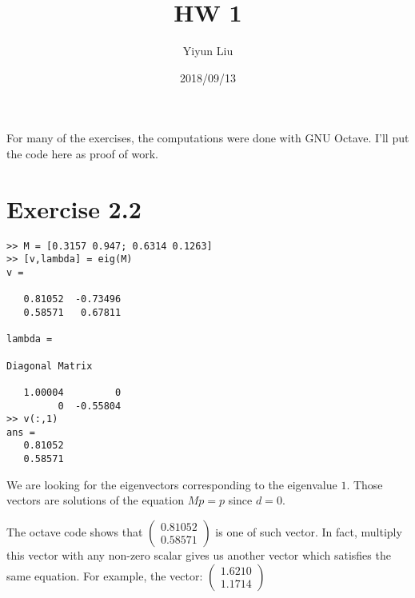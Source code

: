 \documentclass{article}
\title{HW 1}
\date{2018/09/13}
\author{Yiyun Liu}
\begin{document}
\maketitle
\lstset{basicstyle=\ttfamily}
For many of the exercises, the computations were done with GNU
Octave. I'll put the code here as proof of work.
\section*{Exercise 2.2}
\begin{lstlisting}
>> M = [0.3157 0.947; 0.6314 0.1263]
>> [v,lambda] = eig(M)
v =

   0.81052  -0.73496
   0.58571   0.67811

lambda =

Diagonal Matrix

   1.00004         0
         0  -0.55804
>> v(:,1)
ans =
   0.81052
   0.58571
\end{lstlisting}

We are looking for the eigenvectors corresponding to the eigenvalue
$1$. Those vectors are solutions of the equation $Mp=p$ since $d=0$.

The octave code shows that $
\begin{pmatrix}
  0.81052\\
  0.58571
\end{pmatrix}
$ is one of such vector. In fact, multiply this vector with any
non-zero scalar gives us another vector which satisfies the same
equation. For example, the vector: $
\begin{pmatrix}
  1.6210\\
  1.1714
\end{pmatrix}
$
\end{document}
